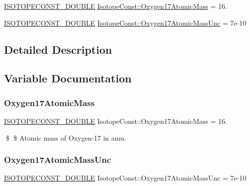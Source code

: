 \begin{DoxyCompactItemize}
\item 
\mbox{\hyperlink{group___isotope_const-_macros_ga8f45a7272ce02c0b4c65c44636ed719a}{I\+S\+O\+T\+O\+P\+E\+C\+O\+N\+S\+T\+\_\+\+D\+O\+U\+B\+LE}} \mbox{\hyperlink{group___isotope_const-_oxygen-_o17_gaa42ac2ff55a0be4aae6f88dac2f4d9b8}{Isotope\+Const\+::\+Oxygen17\+Atomic\+Mass}} = 16.
\item 
\mbox{\hyperlink{group___isotope_const-_macros_ga8f45a7272ce02c0b4c65c44636ed719a}{I\+S\+O\+T\+O\+P\+E\+C\+O\+N\+S\+T\+\_\+\+D\+O\+U\+B\+LE}} \mbox{\hyperlink{group___isotope_const-_oxygen-_o17_ga1e61a12fc75ce6197d74e8a20b6dab60}{Isotope\+Const\+::\+Oxygen17\+Atomic\+Mass\+Unc}} = 7e-\/10
\end{DoxyCompactItemize}


\subsection{Detailed Description}


\subsection{Variable Documentation}
\mbox{\label{group___isotope_const-_oxygen-_o17_gaa42ac2ff55a0be4aae6f88dac2f4d9b8}} 
\subsubsection{\texorpdfstring{Oxygen17\+Atomic\+Mass}{Oxygen17AtomicMass}}
{\footnotesize\ttfamily \mbox{\hyperlink{group___isotope_const-_macros_ga8f45a7272ce02c0b4c65c44636ed719a}{I\+S\+O\+T\+O\+P\+E\+C\+O\+N\+S\+T\+\_\+\+D\+O\+U\+B\+LE}} Isotope\+Const\+::\+Oxygen17\+Atomic\+Mass = 16.}

\$ \$ Atomic mass of Oxygen-\/17 in amu. \mbox{\label{group___isotope_const-_oxygen-_o17_ga1e61a12fc75ce6197d74e8a20b6dab60}} 
\subsubsection{\texorpdfstring{Oxygen17\+Atomic\+Mass\+Unc}{Oxygen17AtomicMassUnc}}
{\footnotesize\ttfamily \mbox{\hyperlink{group___isotope_const-_macros_ga8f45a7272ce02c0b4c65c44636ed719a}{I\+S\+O\+T\+O\+P\+E\+C\+O\+N\+S\+T\+\_\+\+D\+O\+U\+B\+LE}} Isotope\+Const\+::\+Oxygen17\+Atomic\+Mass\+Unc = 7e-\/10}

